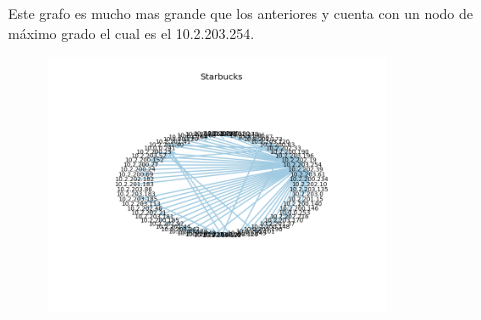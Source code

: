 
Este grafo es mucho mas grande que los anteriores y cuenta con un nodo de máximo grado el cual es el 10.2.203.254.

\begin{figure}[H]
 \centering
	\includegraphics[width=0.8\textwidth]{figs/dc.png}
	\caption{}
	\label{fig:dc-grafo}
\end{figure}
